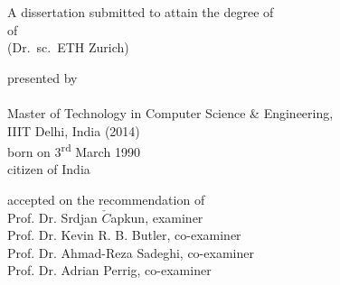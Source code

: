 \begin{titlepage}
    \begin{center}
        \large
        \begingroup
        \endgroup

        \hfill

        \vfill

        \begingroup
            \spacedallcaps{\myTitle}
        \endgroup

        \vfill

        \begingroup
            A dissertation submitted to attain the degree of\\
            \vspace{0.5em}
            of
             \\
            (Dr.\ sc.\ ETH Zurich)
        \endgroup

        \vfill

        \begingroup
            presented by\\
            \vspace{0.5em}
            \spacedallcaps{\myName}\\\vspace{0.5em}
            Master of Technology in Computer Science \& Engineering,\\ IIIT Delhi, India (2014)\\
            \vspace{0.5em}
            born on 3\textsuperscript{rd} March 1990\\
            citizen of India
        \endgroup

        \vfill

        \begingroup
            accepted on the recommendation of\\
            \vspace{0.5em}
            \ifreviewDraft
            Prof. Dr. Srdjan $\check{C}$apkun, examiner\\
			Prof. Dr. Kevin R. B. Butler, co-examiner\\
			Prof. Dr. Ahmad-Reza Sadeghi, co-examiner\\
			Prof. Dr. Adrian Perrig, co-examiner
			\fi
        \endgroup

        \vfill

        \myTime%

        \vfill
    \end{center}
\end{titlepage}
